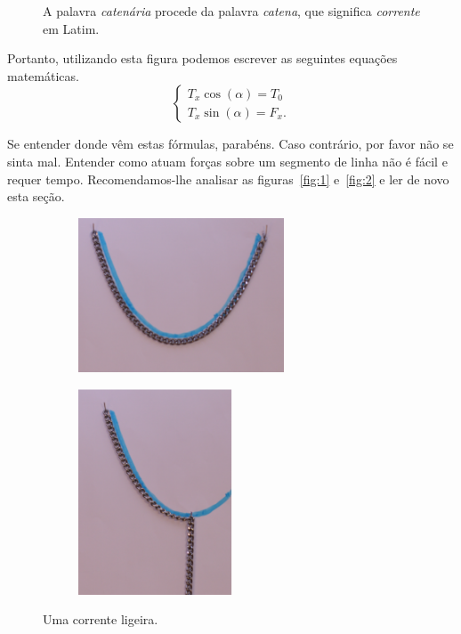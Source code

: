\begin{figure}
  \begin{mybox}
    A palavra \emph{catenária} procede da palavra \emph{catena},
    que significa \emph{corrente} em Latim.
\end{mybox}
\end{figure}
Portanto, utilizando esta figura podemos escrever as seguintes
equações matemáticas.
\begin{equation}
  \label{eq:7}
  \left\{
    \begin{array}{l}
      T_x\cos(\alpha) = T_0 \\
      T_x\sin(\alpha) = F_x.
    \end{array}
\right.
\end{equation}

Se entender donde vêm estas fórmulas, parabéns. Caso contrário, por favor não se sinta mal. Entender como atuam forças sobre um
segmento de linha não é fácil e requer tempo. Recomendamos-lhe
analisar as figuras~\ref{fig:1} e~\ref{fig:2} e ler de novo esta
seção.


\begin{figure}
  \begin{figurebox}
    \vspace{20pt}
    \centering
\begin{subfigure}{.5\textwidth}
  \centering
   \includegraphics[height=130pt]{cat1.png}
   \caption{}
  \label{fig:0a}
\end{subfigure}%
\begin{subfigure}{.5\textwidth}
  \centering
  \includegraphics[width=130pt]{cat2.png}
  \caption{}
  \label{fig:0b}
\end{subfigure}
\caption{Uma corrente ligeira.}
\label{fig:test}
  \end{figurebox}
\end{figure}


